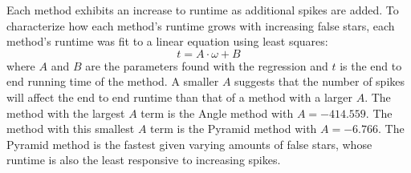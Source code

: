 %
%
%
Each method exhibits an increase to runtime as additional spikes are added.
To characterize how each method's runtime grows with increasing false stars, each method's runtime was fit to a linear
equation using least squares:
\begin{equation}
    t = A\cdot\omega + B
\end{equation}
where $A$ and $B$ are the parameters found with the regression and $t$ is the end to end running time of the method.
A smaller $A$ suggests that the number of spikes will affect the end to end runtime than that of a method with a larger
$A$.
The method with the largest $A$ term is the Angle method with $A = -414.559$.
The method with this smallest $A$ term is the Pyramid method with $A = -6.766$.
The Pyramid method is the fastest given varying amounts of false stars, whose runtime is also the least responsive to
increasing spikes.

